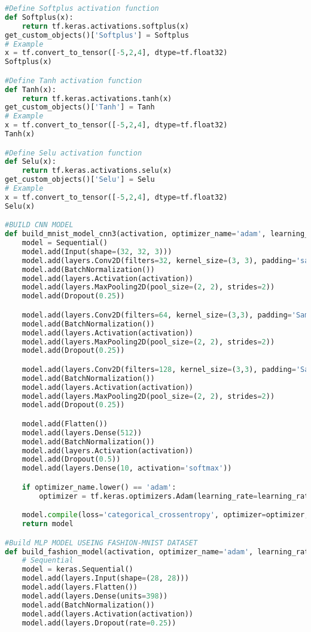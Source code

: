 \begin{lstlisting}[language=Python, ]
#Define Softplus activation function
def Softplus(x):
    return tf.keras.activations.softplus(x)
get_custom_objects()['Softplus'] = Softplus
# Example
x = tf.convert_to_tensor([-5,2,4], dtype=tf.float32)
Softplus(x)

#Define Tanh activation function
def Tanh(x):
    return tf.keras.activations.tanh(x)
get_custom_objects()['Tanh'] = Tanh
# Example
x = tf.convert_to_tensor([-5,2,4], dtype=tf.float32)
Tanh(x)

#Define Selu activation function
def Selu(x):
    return tf.keras.activations.selu(x)
get_custom_objects()['Selu'] = Selu
# Example
x = tf.convert_to_tensor([-5,2,4], dtype=tf.float32)
Selu(x)

#BUILD CNN MODEL 
def build_mnist_model_cnn3(activation, optimizer_name='adam', learning_rate=0.001):
    model = Sequential()
    model.add(Input(shape=(32, 32, 3)))
    model.add(layers.Conv2D(filters=32, kernel_size=(3, 3), padding='same'))
    model.add(BatchNormalization())
    model.add(layers.Activation(activation))
    model.add(layers.MaxPooling2D(pool_size=(2, 2), strides=2))
    model.add(Dropout(0.25))

    model.add(layers.Conv2D(filters=64, kernel_size=(3,3), padding='Same'))
    model.add(BatchNormalization())
    model.add(layers.Activation(activation))
    model.add(layers.MaxPooling2D(pool_size=(2, 2), strides=2))
    model.add(Dropout(0.25))

    model.add(layers.Conv2D(filters=128, kernel_size=(3,3), padding='Same'))
    model.add(BatchNormalization())
    model.add(layers.Activation(activation))
    model.add(layers.MaxPooling2D(pool_size=(2, 2), strides=2))
    model.add(Dropout(0.25))

    model.add(Flatten())
    model.add(layers.Dense(512))
    model.add(BatchNormalization())
    model.add(layers.Activation(activation))
    model.add(Dropout(0.5))
    model.add(layers.Dense(10, activation='softmax'))

    if optimizer_name.lower() == 'adam':
        optimizer = tf.keras.optimizers.Adam(learning_rate=learning_rate)

    model.compile(loss='categorical_crossentropy', optimizer=optimizer, metrics=['accuracy'])
    return model

#Build MLP MODEL USEING FASHION-MNIST DATASET
def build_fashion_model(activation, optimizer_name='adam', learning_rate=0.001):
    # Sequential 
    model = keras.Sequential()
    model.add(layers.Input(shape=(28, 28)))
    model.add(layers.Flatten())
    model.add(layers.Dense(units=398))
    model.add(BatchNormalization())
    model.add(layers.Activation(activation))
    model.add(layers.Dropout(rate=0.25)) 
    

\end{lstlisting}

